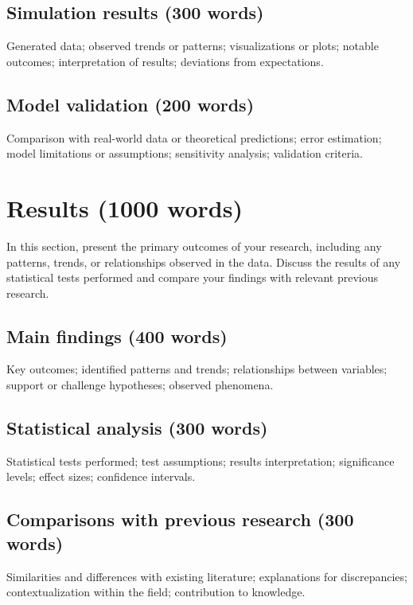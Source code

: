 \documentclass[journal,article,submit,pdftex,moreauthors]{Definitions/mdpi}
\begin{document}
\subsection{Simulation results (300 words)} Generated data; observed trends or patterns; visualizations or plots; notable outcomes; interpretation of results; deviations from expectations.

\subsection{Model validation (200 words)} Comparison with real-world data or theoretical predictions; error estimation; model limitations or assumptions; sensitivity analysis; validation criteria.

%
%

\section{Results (1000 words)} \label{sec:6}
In this section, present the primary outcomes of your research, including any patterns, trends, or relationships observed in the data. Discuss the results of any statistical tests performed and compare your findings with relevant previous research.
\subsection{Main findings (400 words)} Key outcomes; identified patterns and trends; relationships between variables; support or challenge hypotheses; observed phenomena.

\subsection{Statistical analysis (300 words)} Statistical tests performed; test assumptions; results interpretation; significance levels; effect sizes; confidence intervals.

\subsection{Comparisons with previous research (300 words)} Similarities and differences with existing literature; explanations for discrepancies; contextualization within the field; contribution to knowledge.


\end{document}
